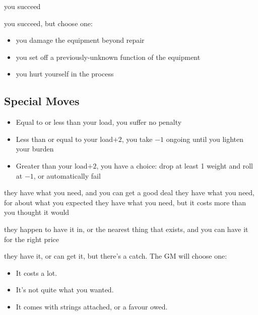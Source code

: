 {you succeed}
{you succeed, but choose one:
\begin{itemize}
\item you damage the equipment beyond repair
\item you set off a previously-unknown function of the equipment
\item you hurt yourself in the process
\end{itemize}}

\subsection{Special Moves}



\begin{itemize}
\item Equal to or less than your load, you suffer no penalty
\item Less than or equal to your load$+2$, you take $-1$ ongoing until you lighten your burden
\item Greater than your load$+2$, you have a choice: drop at least 1 weight and roll at $-1$, or automatically fail
\end{itemize}

{they have what you need, and you can get a good deal}
{they have what you need, for about what you expected}
{they have what you need, but it costs more than you thought it would}

{they happen to have it in, or the nearest thing that exists, and you can have it for the right price}
{they have it, or can get it, but there's a catch. The GM will choose one:
\begin{itemize}
\item It costs a lot.
\item It's not quite what you wanted.
\item It comes with strings attached, or a favour owed.
\end{itemize}}


